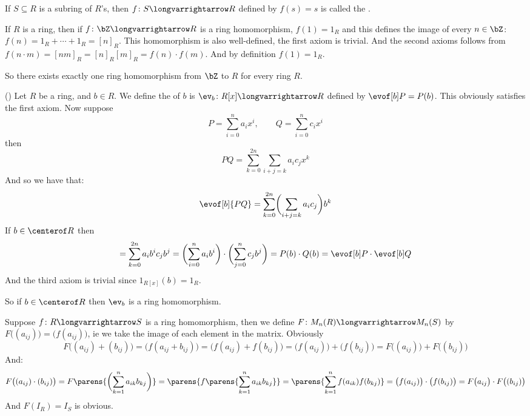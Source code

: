 \documentclass[10pt]{article}
\begin{document}
\begin{exam*}

    If $S\subseteq R$ is a subring of $R$'s, then $f\colon S\longvarrightarrow R$ defined by $f(s)=s$ is called the .

\end{exam*}

\begin{exam*}

    If $R$ is a ring, then if $f\colon\bZ\longvarrightarrow R$ is a ring homomorphism, $f(1)=1_R$ and this defines the image of every $n\in\bZ$: $f(n)=1_R+\cdots+1_R=[n]_R$.
    This homomorphism is also well-defined, the first axiom is trivial.
    And the second axioms follows from $f(n\cdot m)=[nm]_R=[n]_R[m]_R=f(n)\cdot f(m)$.
    And by definition $f(1)=1_R$.

    So there exists exactly one ring homomorphism from $\bZ$ to $R$ for every ring $R$.

\end{exam*}

\begin{exam*}

    ({})
    Let $R$ be a ring, and $b\in R$.
    We define the  of $b$ is $\ev_b\colon R[x]\longvarrightarrow R$ defined by $\evof[b]P=P(b)$.
    This obviously satisfies the first axiom.
    Now suppose
    \[ P = \sum_{i=0}^n a_ix^i,\qquad Q = \sum_{i=0}^n c_ix^i \]
    then
    \[ PQ = \sum_{k=0}^{2n}\sum_{i+j=k} a_ic_jx^k \]
    And so we have that:
    \[ \evof[b]{PQ} = \sum_{k=0}^{2n}\biggl(\sum_{i+j=k} a_ic_j\biggr)b^k \]
    If $b\in\centerof R$ then
    \[ = \sum_{k=0}^{2n}a_ib^ic_jb^j = \biggl(\sum_{i=0}^n a_ib^i\biggr)\cdot\biggl(\sum_{j=0}^n c_jb^j\biggr) = P(b)\cdot Q(b) = \evof[b]P\cdot\evof[b]Q \]
    And the third axiom is trivial since $1_{R[x]}(b)=1_R$.

    So if $b\in\centerof R$ then $\ev_b$ is a ring homomorphism.

\end{exam*}

\begin{exam*}

    Suppose $f\colon R\longvarrightarrow S$ is a ring homomorphism, then we define $F\colon M_n(R)\longvarrightarrow M_n(S)$ by $F\bigl((a_{ij})\bigr)=\bigl(f(a_{ij})\bigr)$, ie we take the image of each
    element in the matrix.
    Obviously
    \[ F\bigl((a_{ij}) + (b_{ij})\bigr) = \bigl(f(a_{ij} + b_{ij})\bigr) = \bigl(f(a_{ij}) + f(b_{ij})\bigr) = \bigl(f(a_{ij})\bigr) + \bigl(f(b_{ij})\bigr) = F\bigl((a_{ij})\bigr) + F\bigl((b_{ij})\bigr) \]
    And:
    \[ F\bigl((a_{ij}) \cdot (b_{ij})\bigr) = F\parens{\biggl(\sum_{k=1}^n a_{ik}b_{kj}\biggr)} = \parens{f\parens{\sum_{k=1}^n a_{ik}b_{kj}}} = \parens{\sum_{k=1}^n f(a_{ik})f(b_{kj})} = 
    \bigl(f(a_{ij})\bigr) \cdot \bigl(f(b_{ij})\bigr) = F\bigl(a_{ij}\bigr)\cdot F\bigl((b_{ij})\bigr) \]
    And $F(I_R)=I_S$ is obvious.

\end{exam*}
\end{document}
